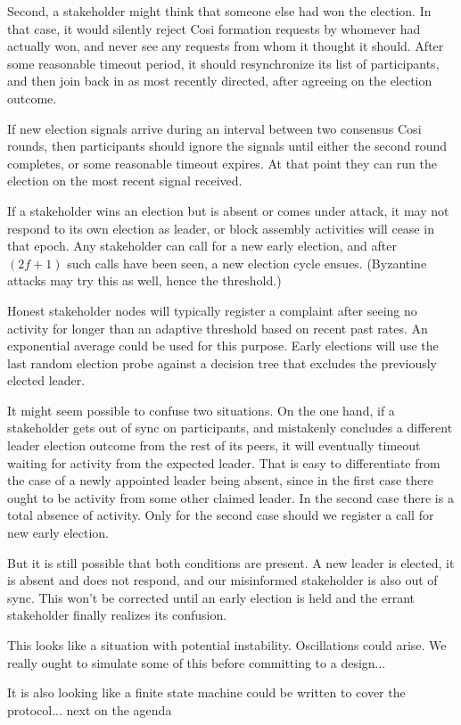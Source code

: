 \documentclass{yellowpaper}
\begin{document}
Second, a stakeholder might think that someone else had won the election. In that case, it would silently reject Cosi formation requests by whomever had actually won, and never see any requests from whom it thought it should. After some reasonable timeout period, it should resynchronize its list of participants, and then join back in as most recently directed, after agreeing on the election outcome.

If new election signals arrive during an interval between two consensus Cosi rounds, then participants should ignore the signals until either the second round completes, or some reasonable timeout expires. At that point they can run the election on the most recent signal received. 

If a stakeholder wins an election but is absent or comes under attack, it may not respond to its own election as leader, or block assembly activities will cease in that epoch. Any stakeholder can call for a new early election, and after $(2 f+1)$ such calls have been seen, a new election cycle ensues. (Byzantine attacks may try this as well, hence the threshold.)

Honest stakeholder nodes will typically register a complaint after seeing no activity for longer than an adaptive threshold based on recent past rates. An exponential average could be used for this purpose. Early elections will use the last random election probe against a decision tree that excludes the previously elected leader.

It might seem possible to confuse two situations. On the one hand, if a stakeholder gets out of sync on participants, and mistakenly concludes a different leader election outcome from the rest of its peers, it will eventually timeout waiting for activity from the expected leader. That is easy to differentiate from the case of a newly appointed leader being absent, since in the first case there ought to be activity from some other claimed leader. In the second case there is a total absence of activity. Only for the second case should we register a call for new early election.

But it is still possible that both conditions are present. A new leader is elected, it is absent and does not respond, and our misinformed stakeholder is also out of sync. This won't be corrected until an early election is held and the errant stakeholder finally realizes its confusion.
$$
$$
{\em{This looks like a situation with potential instability. 
Oscillations could arise. 
We really ought to simulate some of this before committing to a design...

It is also looking like a finite state machine could be written to cover the protocol... next on the agenda
}}
$$
$$
\end{document}
